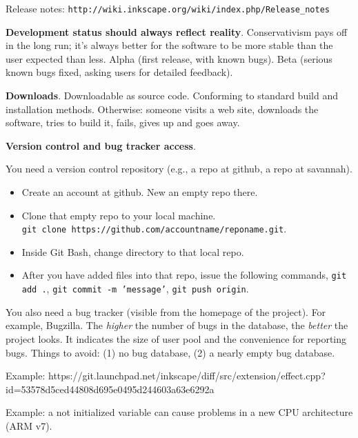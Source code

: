 \documentclass[landscape,30pt]{foils}
\begin{document}
Release notes:  \texttt{http://wiki.inkscape.org/wiki/index.php/Release\_notes}


{\bf Development status should always reflect reality}.
Conservativism pays off in the long run; it's always better for the
software to be more stable than the user expected than less.  Alpha (first release, with known bugs).  Beta (serious known bugs fixed, asking users for detailed feedback).

{\bf Downloads}.  Downloadable as source code.   Conforming to standard build and installation methods.
Otherwise: someone visits a web site, downloads the software, tries to build it, fails, gives up and goes away.

{\bf Version control and bug tracker access}.

You need a version control repository (e.g., a repo at github, a repo at savannah).

\begin{itemize}
\item Create an account at github.  New an empty repo there.
\item Clone that empty repo to your local machine.  \\
  \texttt{git clone https://github.com/accountname/reponame.git}.
\item Inside Git Bash, change directory to that local repo.
\item After you have added files into that repo, issue the following commands, \texttt{git add .}, \texttt{git commit -m 'message'}, \texttt{git push origin}.
\end{itemize}


You also need a bug tracker (visible from the homepage of the
project).  For example, Bugzilla.  The {\em higher} the number of bugs
in the database, the {\em better} the project looks.  It indicates the
size of user pool and the convenience for reporting bugs.  Things to
avoid: (1) no bug database, (2) a nearly empty bug database.

Example: https://git.launchpad.net/inkscape/diff/src/extension/effect.cpp?id=53578d5ced44808d695e0495d244603a63e6292a

Example: a not initialized variable can cause problems in a new CPU architecture (ARM v7).
\end{document}
